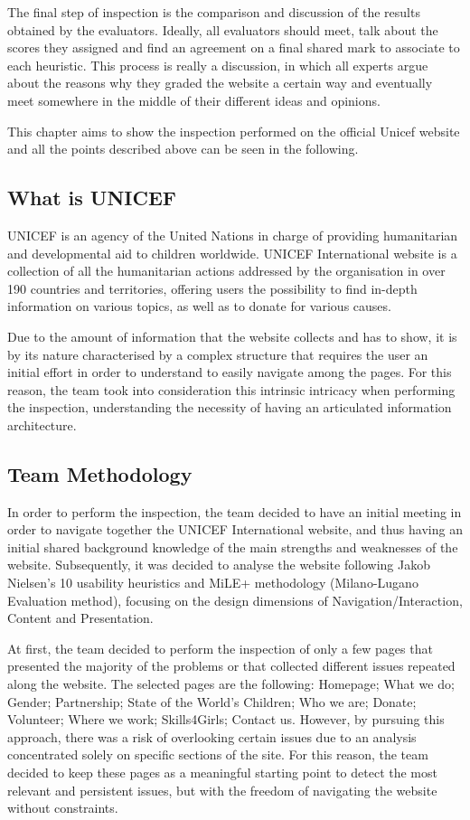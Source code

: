 The final step of inspection is the comparison and discussion of the results obtained by the evaluators. Ideally, all evaluators should meet, talk about the scores they assigned and find an agreement on a final shared mark to associate to each heuristic. This process is really a discussion, in which all experts argue about the reasons why they graded the website a certain way and eventually meet somewhere in the middle of their different ideas and opinions.

This chapter aims to show the inspection performed on the official Unicef website and all the points described above can be seen in the following.
\clearpage

\subsection{What is UNICEF}
UNICEF is an agency of the United Nations in charge of providing humanitarian and developmental aid to children worldwide. UNICEF International website is a collection of all the humanitarian actions addressed by the organisation in over 190 countries and territories, offering users the possibility to find in-depth information on various topics, as well as to donate for various causes.

Due to the amount of information that the website collects and has to show, it is by its nature characterised by a complex structure that requires the user an initial effort in order to understand to easily navigate among the pages. For this reason, the team took into consideration this intrinsic intricacy when performing the inspection, understanding the necessity of having an articulated information architecture.
\clearpage

\subsection{Team Methodology}
In order to perform the inspection, the team decided to have an initial meeting in order to navigate together the UNICEF International website, and thus having an initial shared background knowledge of the main strengths and weaknesses of the website. 
Subsequently, it was decided to analyse the website following Jakob Nielsen's 10 usability heuristics and MiLE+ methodology (Milano-Lugano Evaluation method), focusing on the design dimensions of Navigation/Interaction, Content and Presentation.

At first, the team decided to perform the inspection of only a few pages that presented the majority of the problems or that collected different issues repeated along the website. The selected pages are the following: Homepage; What we do; Gender; Partnership; State of the World’s Children; Who we are; Donate; Volunteer; Where we work; Skills4Girls; Contact us.
However, by pursuing this approach, there was a risk of overlooking certain issues due to an analysis concentrated solely on specific sections of the site. For this reason, the team decided to keep these pages as a meaningful starting point to detect the most relevant and persistent issues, but with the freedom of navigating the website without constraints.

